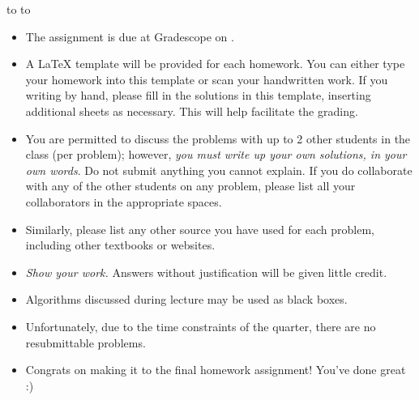 \documentclass[10pt]{article}
\newcommand{\handout}{
   \renewcommand{\thepage}{H\hnumber-\arabic{page}}
   \noindent
   \begin{center}
      \vbox{
    \hbox to \columnwidth {\sc{\course} --- \prof \hfill}
    \vspace{-2mm}
    \hbox to \columnwidth {\sc due \MakeLowercase{\duedate} \duelocation\hfill {\Huge\color{mdb}H\hnumber.\yourname}}
      }
   \end{center}
   \vspace*{2mm}
}
\begin{document}
\handout
\begin{itemize}
\item The assignment is due at Gradescope on \duedate.

\item A LaTeX template will be provided for each homework. You can either type your homework into this template or scan your handwritten work. If you writing by hand, please fill in the solutions in this template, inserting additional sheets as necessary. This will help facilitate the grading.

\item You are permitted to discuss the problems with up to 2 other students in the class (per problem); however, {\em you must write up your own solutions, in your own words}. Do not submit anything you cannot explain. If you do collaborate with any of the other students on any problem, please list all your collaborators in the appropriate spaces.

\item Similarly, please list any other source you have used for each problem, including other textbooks or websites.

\item {\em Show your work.} Answers without justification will be given little credit.

\item Algorithms discussed during lecture may be used as black boxes.

\item Unfortunately, due to the time constraints of the quarter, there are no resubmittable problems. 

\item Congrats on making it to the final homework assignment! You've done great :)

\end{itemize}

\newpage
\end{document}
